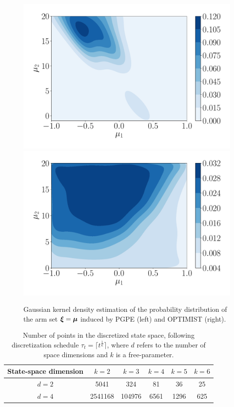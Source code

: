 \begin{figure}[t!] 
\centering
\includegraphics[width=.5\textwidth]{Images/MCgainPGPE.pdf}\hfill
\includegraphics[width=.5\textwidth]{Images/MCgainOPTIMIST.pdf}
\caption{Gaussian kernel density estimation \cite{scott2015multivariate} of the probability distribution of the arm set $\boldsymbol{\xi}=\boldsymbol{\mu}$ induced by \gls{PGPE} (left) and \gls{OPTIMIST} (right).} 
\label{fig:MCgain}
\end{figure} 

\begin{table}[t!]
\centering
\begin{tabular}{c|ccccc} 
\toprule
State-space dimension & $k=2$ & $k=3$ & $k=4$ & $k=5$ & $k=6$\\
\midrule
$d=2$ & 5041 & 324 & 81 & 36 & 25\\
$d=4$ & 2541168 & 104976 & 6561 & 1296 & 625\\
\bottomrule
\end{tabular}
\caption{Number of points in the discretized state space, following discretization schedule $\tau_t=\lceil t^{\frac{1}{\kappa}} \rceil$, where $d$ refers to the number of space dimensions and $k$ is a free-parameter.}
\label{tab:granularity}
\end{table}

